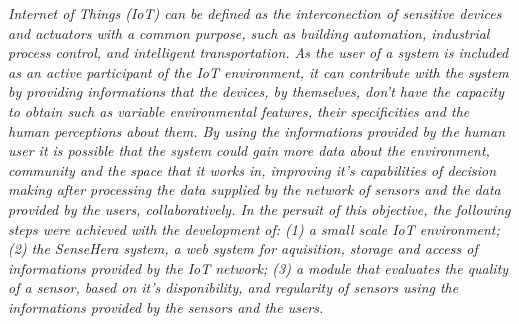 \emph{
Internet of Things (IoT) can be defined as the interconection of sensitive devices and actuators with a common purpose, such as building automation, industrial process control, and intelligent transportation. %
As the user of a system is included as an active participant of the IoT environment, it can contribute with the system by providing informations that the devices, by themselves, don't have the capacity to obtain such as variable environmental features, their specificities and the human perceptions about them.
 By using the informations provided by the human user it is possible that the system could gain more data about the environment, community and the space that it works in, improving it's capabilities of decision making after processing the data supplied by the network of sensors and the data provided by the users, collaboratively.
  In the persuit of this objective, the following steps were achieved with the development of: (1) a small scale IoT environment;
  (2) the SenseHera system, a web system for aquisition, storage and access of informations provided by the IoT network;
  (3) a module that evaluates the quality of a sensor, based on it's disponibility, and regularity of sensors using the informations provided by the sensors and the users.
}
